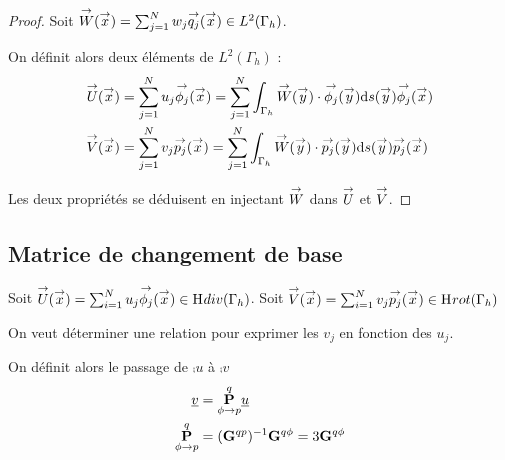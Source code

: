     \begin{proof}
      Soit  \(\vect{W}(\vx) = \sum_{j=1}^N w_j \qj(\vx) \in L^2(\Gamma_h)\).

      On définit alors deux éléments de \(L^2(\Gamma_h)\) :
      \begin{align}
        \vect{U}(\vx) &= \sum_{j=1}^N u_j \phij(\vx) = \sum_{j=1}^N \int_{\Gamma_h}\vect{W}(\vy)\cdot\phij(\vy)\dd{s}(\vy) \phij(\vx  )
        \\
        \vect{V}(\vx) &= \sum_{j=1}^N v_j \pj(\vx) = \sum_{j=1}^N \int_{\Gamma_h}\vect{W}(\vy)\cdot\pj(\vy)\dd{s}(\vy) \pj(\vx)
      \end{align}

      Les deux propriétés se déduisent en injectant \(\vect{W}\) dans \(\vect{U}\) et \(\vect{V}\).
    \end{proof}




  \subsection{Matrice de changement de base}

    Soit \(\vect{U}(\vx) = \sum_{i=1}^N u_j \phij(\vx) \in \Hdiv(\Gamma_h)\).
    Soit \(\vect{V}(\vx) = \sum_{i=1}^N v_j \pj(\vx) \in \Hrot(\Gamma_h)\)  

    On veut déterminer une relation pour exprimer les \(v_j\) en fonction des \(u_j\).


    \begin{prop}
      On définit alors le passage de \(\comp{u}\) à \(\comp{v}\)
      \begin{align*}
        \comp{v} &= \mP{\phi}{p}{q} \comp{u}
        \\
        \mP{\phi}{p}{q} &= (\mG{q}{p})^{-1}\mG{q}{\phi} = 3 \mG{q}{\phi}
      \end{align*}
    \end{prop}


